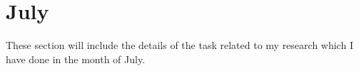 \chapter{July}
\label{chap:Jul}


These section will include the details of the task related to my research which I have done in the month of July.




